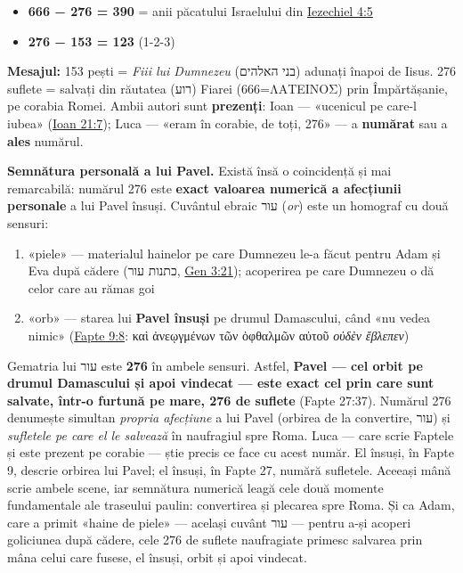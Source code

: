 \documentclass[12pt,a4paper,twoside,openany]{book}
\begin{document}
\begin{itemize}
  \item \textbf{666 − 276 = 390} = anii păcatului Israelului din \href{https://bibliaortodoxa.ro/carte.php?id=33\&cap=4\#5}{Iezechiel 4:5}
  \item \textbf{276 − 153 = 123} (1-2-3)
\end{itemize}
\textbf{Mesajul:} 153 pești = \textit{Fiii lui Dumnezeu} (בני האלהים) adunați înapoi de Iisus. 276 suflete = salvați din răutatea (רוע) Fiarei (666=ΛΑΤΕΙΝΟΣ) prin Împărtășanie, pe corabia Romei. Ambii autori sunt \textbf{prezenți}: Ioan — «ucenicul pe care-l iubea» (\href{https://bibliaortodoxa.ro/carte.php?id=35\&cap=21\#7}{Ioan 21:7}); Luca — «eram în corabie, de toți, 276» — a \textbf{numărat} sau a \textbf{ales} numărul.

\textbf{Semnătura personală a lui Pavel.} Există însă o coincidență și mai remarcabilă: numărul 276 este \textbf{exact valoarea numerică a afecțiunii personale} a lui Pavel însuși. Cuvântul ebraic עור (\textit{or}) este un homograf cu două sensuri:
\begin{enumerate}
  \item «piele» — materialul hainelor pe care Dumnezeu le-a făcut pentru Adam și Eva după cădere (כתנות עור, \href{https://bibliaortodoxa.ro/carte.php?id=25\&cap=3\#21}{Gen 3:21}); acoperirea pe care Dumnezeu o dă celor care au rămas goi
  \item «orb» — starea lui \textbf{Pavel însuși} pe drumul Damascului, când «nu vedea nimic» (\href{https://bibliaortodoxa.ro/carte.php?id=26\&cap=9\#8}{Fapte 9:8}: καὶ ἀνεῳγμένων τῶν ὀφθαλμῶν αὐτοῦ \textit{οὐδὲν ἔβλεπεν})
\end{enumerate}
Gematria lui עור este \textbf{276} în ambele sensuri. Astfel, \textbf{Pavel — cel orbit pe drumul Damascului și apoi vindecat — este exact cel prin care sunt salvate, într-o furtună pe mare, 276 de suflete} (Fapte 27:37). Numărul 276 denumește simultan \textit{propria afecțiune} a lui Pavel (orbirea de la convertire, עור) și \textit{sufletele pe care el le salvează} în naufragiul spre Roma. Luca — care scrie Faptele și este prezent pe corabie — știe precis ce face cu acest număr. El însuși, în Fapte 9, descrie orbirea lui Pavel; el însuși, în Fapte 27, numără sufletele. Aceeași mână scrie ambele scene, iar semnătura numerică leagă cele două momente fundamentale ale traseului paulin: convertirea și plecarea spre Roma. Și ca Adam, care a primit «haine de piele» — același cuvânt עור — pentru a-și acoperi goliciunea după cădere, cele 276 de suflete naufragiate primesc salvarea prin mâna celui care fusese, el însuși, orbit și apoi vindecat.
\end{document}
